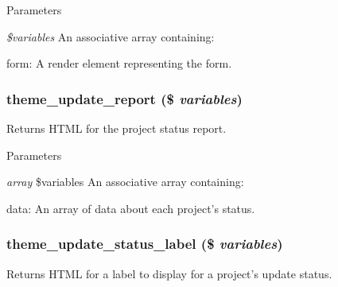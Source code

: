 \begin{DoxyParams}{Parameters}
\item[{\em \$variables}]An associative array containing:
\begin{DoxyItemize}
\item form: A render element representing the form. 
\end{DoxyItemize}\end{DoxyParams}
\hypertarget{group__themeable_gab9223d8dc740de3fd1b9fd98c819e438}{
\subsubsection[{theme\_\-update\_\-report}]{\setlength{\rightskip}{0pt plus 5cm}theme\_\-update\_\-report (\$ {\em variables})}}
\label{group__themeable_gab9223d8dc740de3fd1b9fd98c819e438}
Returns HTML for the project status report.


\begin{DoxyParams}{Parameters}
\item[{\em array}]\$variables An associative array containing:
\begin{DoxyItemize}
\item data: An array of data about each project's status. 
\end{DoxyItemize}\end{DoxyParams}
\hypertarget{group__themeable_ga0207c01d37d3cb060dabc28b55db5285}{
\subsubsection[{theme\_\-update\_\-status\_\-label}]{\setlength{\rightskip}{0pt plus 5cm}theme\_\-update\_\-status\_\-label (\$ {\em variables})}}
\label{group__themeable_ga0207c01d37d3cb060dabc28b55db5285}
Returns HTML for a label to display for a project's update status.


